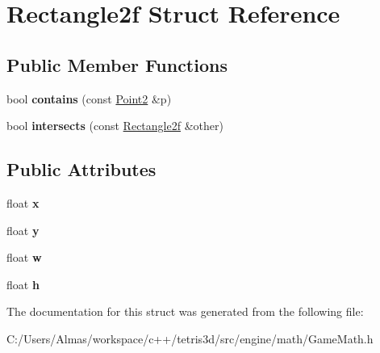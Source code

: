 \hypertarget{struct_rectangle2f}{\section{Rectangle2f Struct Reference}
\label{struct_rectangle2f}
}
\subsection*{Public Member Functions}
\begin{DoxyCompactItemize}
\item 
\hypertarget{struct_rectangle2f_a0a8d1c1b0b4bd7403671cdd6b9bba52c}{bool {\bfseries contains} (const \hyperlink{struct_point2}{Point2} \&p)}\label{struct_rectangle2f_a0a8d1c1b0b4bd7403671cdd6b9bba52c}

\item 
\hypertarget{struct_rectangle2f_a4a92586d1049fb1dac6d983a47ddec94}{bool {\bfseries intersects} (const \hyperlink{struct_rectangle2f}{Rectangle2f} \&other)}\label{struct_rectangle2f_a4a92586d1049fb1dac6d983a47ddec94}

\end{DoxyCompactItemize}
\subsection*{Public Attributes}
\begin{DoxyCompactItemize}
\item 
\hypertarget{struct_rectangle2f_a65125a6eb50f78b055ea962dcb99a87d}{float {\bfseries x}}\label{struct_rectangle2f_a65125a6eb50f78b055ea962dcb99a87d}

\item 
\hypertarget{struct_rectangle2f_a7d901cb6273a96a4b7dbd702c89b4131}{float {\bfseries y}}\label{struct_rectangle2f_a7d901cb6273a96a4b7dbd702c89b4131}

\item 
\hypertarget{struct_rectangle2f_ac2de530cfbf7ed9fb32018933910b22a}{float {\bfseries w}}\label{struct_rectangle2f_ac2de530cfbf7ed9fb32018933910b22a}

\item 
\hypertarget{struct_rectangle2f_abfeb13b983a0de2dbbf11c0dd31e9c73}{float {\bfseries h}}\label{struct_rectangle2f_abfeb13b983a0de2dbbf11c0dd31e9c73}

\end{DoxyCompactItemize}


The documentation for this struct was generated from the following file\-:\begin{DoxyCompactItemize}
\item 
C\-:/\-Users/\-Almas/workspace/c++/tetris3d/src/engine/math/Game\-Math.\-h\end{DoxyCompactItemize}
